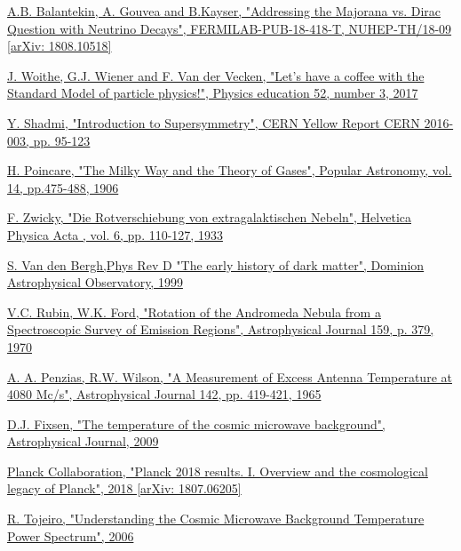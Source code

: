 \documentclass[a4paper, 10pt, openright]{report}
\begin{document}
\begin{thebibliography}{1}
\href{https://arxiv.org/abs/1808.10518}{A.B. Balantekin, A. Gouvea and B.Kayser,
"Addressing the Majorana vs. Dirac Question with Neutrino Decays",
FERMILAB-PUB-18-418-T, NUHEP-TH/18-09 [arXiv: 1808.10518]
}

\href{https://arxiv.org/abs/1808.10518}{J. Woithe, G.J. Wiener and F. Van der Vecken,
"Let's have a coffee with the Standard Model of particle physics!",
Physics education 52, number 3, 2017
}

\href{https://arxiv.org/abs/1708.00772}{Y. Shadmi,
"Introduction to Supersymmetry",
CERN Yellow Report CERN 2016-003, pp. 95-123}

\href{http://adsabs.harvard.edu/full/1906PA.....14..475P}{H. Poincare,
"The Milky Way and the Theory of Gases",
Popular Astronomy, vol. 14, pp.475-488, 1906}

\href{http://articles.adsabs.harvard.edu/cgi-bin/nph-iarticle_query?1933AcHPh...6..110Z&amp;data_type=PDF_HIGH&amp;whole_paper=YES&amp;type=PRINTER&amp;filetype=.pdf}{
F. Zwicky,
"Die Rotverschiebung von extragalaktischen Nebeln",
Helvetica Physica Acta , vol. 6, pp. 110-127, 1933}

\href{https://arxiv.org/pdf/astro-ph/9904251.pdf}{S. Van den Bergh,Phys Rev D
"The early history of dark matter",
Dominion Astrophysical Observatory, 1999
}

\href{https://ui.adsabs.harvard.edu/abs/1970ApJ...159..379R/abstract}{V.C. Rubin, W.K. Ford,
"Rotation of the Andromeda Nebula from a Spectroscopic Survey of Emission Regions",
Astrophysical Journal 159, p. 379, 1970
}

\href{https://ui.adsabs.harvard.edu/abs/1965ApJ...142..419P/abstract}{A. A. Penzias, R.W. Wilson,
"A Measurement of Excess Antenna Temperature at 4080 Mc/s",
Astrophysical Journal 142, pp. 419-421, 1965
}

\href{https://iopscience.iop.org/article/10.1088/0004-637X/707/2/916}{D.J. Fixsen,
"The temperature of the cosmic microwave background",
Astrophysical Journal, 2009
}

\href{https://arxiv.org/abs/1807.06205}{Planck Collaboration, 
"Planck 2018 results. I. Overview and the cosmological legacy of Planck", 2018 [arXiv: 1807.06205]
}


\href{https://www.roe.ac.uk/ifa/postgrad/pedagogy/2006_tojeiro.pdf}{R. Tojeiro,
"Understanding the Cosmic Microwave Background Temperature Power Spectrum",
2006
}


\end{thebibliography}
\end{document}
